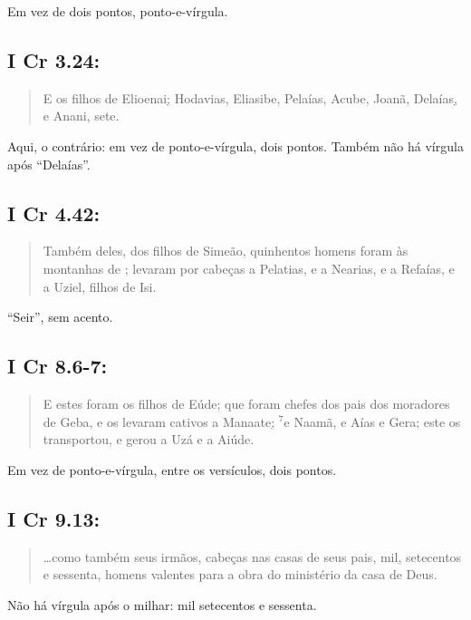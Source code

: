 Em vez de dois pontos, ponto-e-vírgula.

\subsection*{I Cr 3.24:} 
\begin{quote}
    \small
E os filhos de Elioenai\uline{;} Hodavias, Eliasibe, Pelaías, Acube, Joanã, Delaías\uline{,} e Anani, sete.
\end{quote}

Aqui, o contrário: em vez de ponto-e-vírgula, dois pontos. Também não
há vírgula após ``Delaías''.

\subsection*{I Cr 4.42:} 
\begin{quote}
    \small
Também deles, dos filhos de Simeão, quinhentos homens foram às montanhas de ; levaram por cabeças a Pelatias, e a Nearias, e a Refaías, e a Uziel, filhos de Isi.
\end{quote}

``Seir'', sem acento.

\subsection*{I Cr 8.6-7:} 
\begin{quote}
    \small
E estes foram os filhos de Eúde; que foram chefes dos pais dos moradores de Geba, e os levaram cativos a Manaate\uline{;} $^{\mathrm{7}}$e Naamã, e Aías e Gera; este os transportou, e gerou a Uzá e a Aiúde.
\end{quote}

Em vez de ponto-e-vírgula, entre os versículos, dois pontos.

\subsection*{I Cr 9.13:} 
\begin{quote}
    \small
\ldots como também seus irmãos, cabeças nas casas de seus pais, mil\uline{,} setecentos e sessenta, homens valentes para a obra do ministério da casa de Deus.
\end{quote}

Não há vírgula após o milhar: mil setecentos e sessenta.

